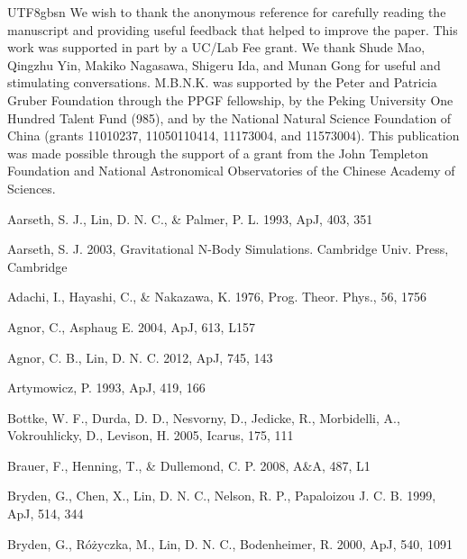 \documentclass[tighten]{aastex6}
\begin{document}
\begin{CJK*}{UTF8}{gbsn}
We wish to thank the anonymous reference for carefully reading the manuscript and providing useful feedback that helped to improve the paper.
This work was supported in part by a UC/Lab Fee grant.  We thank Shude Mao, Qingzhu Yin,  Makiko Nagasawa, Shigeru Ida, and Munan Gong for useful and stimulating conversations.   
M.B.N.K. was supported by the Peter and Patricia Gruber Foundation through the PPGF fellowship, by the Peking University One Hundred Talent Fund (985), and by the National Natural Science Foundation of China (grants 11010237, 11050110414, 11173004, and 11573004). 
This publication was made possible through the support of a grant from 
the John Templeton Foundation and National Astronomical Observatories of the
Chinese Academy of Sciences. 


%
%

\begin{thebibliography}{}


 Aarseth, S. J., Lin, D. N. C., \& Palmer, P. L. 1993, ApJ, 403, 351

 Aarseth, S. J. 2003, Gravitational 
N-Body Simulations. Cambridge Univ. Press, Cambridge 

 Adachi, I., Hayashi, C., \& 
Nakazawa, K. 1976, Prog. Theor. Phys., 56, 1756

 Agnor, C., Asphaug E. 2004, ApJ, 613, L157

 Agnor, C. B., Lin, D. N. C. 2012, ApJ, 745, 143

 Artymowicz, P. 1993, ApJ, 
419, 166

 Bottke, W. F., Durda, D. D., 
Nesvorny, D., Jedicke, R., Morbidelli, A., Vokrouhlicky, D., Levison, 
H. 2005, Icarus, 175, 111

 Brauer, F., Henning, T., \& Dullemond, C. P. 2008, A\&A, 487, L1


 Bryden, G., Chen, X., Lin, D. N. C., Nelson, R. P., Papaloizou J. C. B. 1999, ApJ, 514, 344

 Bryden, G., R\'o\.zyczka, M., Lin, D. N. C., Bodenheimer, R. 2000, ApJ, 540, 1091


\end{thebibliography}
\end{CJK*}
\end{document}
